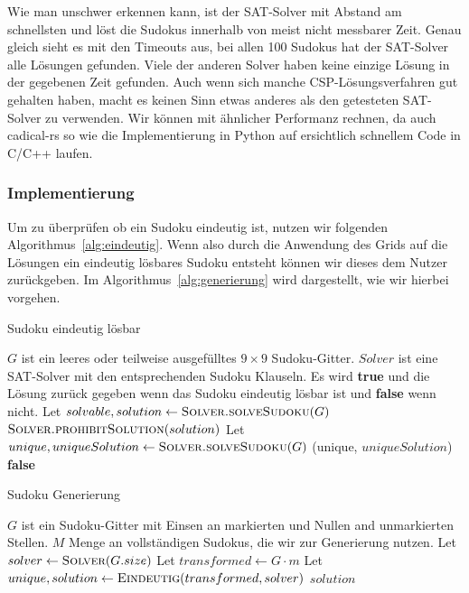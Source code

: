 Wie man unschwer erkennen kann, ist der SAT-Solver mit Abstand am schnellsten und löst die Sudokus innerhalb von meist nicht messbarer Zeit.
Genau gleich sieht es mit den Timeouts aus, bei allen 100 Sudokus hat der SAT-Solver alle Lösungen gefunden. Viele der anderen Solver haben keine einzige Lösung in der gegebenen Zeit gefunden.
Auch wenn sich manche CSP-Lösungsverfahren gut gehalten haben, macht es keinen Sinn etwas anderes als den getesteten SAT-Solver zu verwenden.
Wir können mit ähnlicher Performanz rechnen, da auch cadical-rs so wie die Implementierung in Python auf ersichtlich schnellem Code in C/C++ laufen.

\subsubsection{Implementierung}
Um zu überprüfen ob ein Sudoku eindeutig ist, nutzen wir folgenden Algorithmus~\ref{alg:eindeutig}.
Wenn also durch die Anwendung des Grids auf die Lösungen ein eindeutig lösbares Sudoku entsteht können wir dieses dem Nutzer zurückgeben.
Im Algorithmus~\ref{alg:generierung} wird dargestellt, wie wir hierbei vorgehen.

\begin{algorithm}
    \caption{Sudoku eindeutig lösbar}
    \label{alg:eindeutig}
    \begin{algorithmic}[1]
        \Require $G$ ist ein leeres oder teilweise ausgefülltes $9 \times 9$ Sudoku-Gitter.
        \Require $Solver$ ist eine SAT-Solver mit den entsprechenden Sudoku Klauseln.
        \Ensure Es wird \textbf{true} und die Lösung zurück gegeben wenn das Sudoku eindeutig lösbar ist und \textbf{false} wenn nicht.
            \State Let $solvable, solution \gets \Call{Solver.solveSudoku}{G}$
                \State $\Call{Solver.prohibitSolution}{solution}$
                \State Let $unique, uniqueSolution \gets \Call{Solver.solveSudoku}{G}$
                \State \Return (unique, $uniqueSolution$)
            \Else
                \State \Return \textbf{false}
            \EndIf
        \EndFunction
    \end{algorithmic}
\end{algorithm}


\begin{algorithm}
    \caption{Sudoku Generierung}
    \label{alg:generierung}
    \begin{algorithmic}[1]
        \Require $G$ ist ein Sudoku-Gitter mit Einsen an markierten und Nullen and unmarkierten Stellen.
        \Require $M$ Menge an vollständigen Sudokus, die wir zur Generierung nutzen.
            \State Let $solver \gets \Call{Solver}{G.size}$
                \State Let $transformed \gets G \cdot m$ 
                \State Let $unique, solution \gets \Call{Eindeutig}{transformed, solver}$
                    \State \Return $solution$
                \EndIf
            \EndFor

        \EndFunction
    \end{algorithmic}
\end{algorithm}

